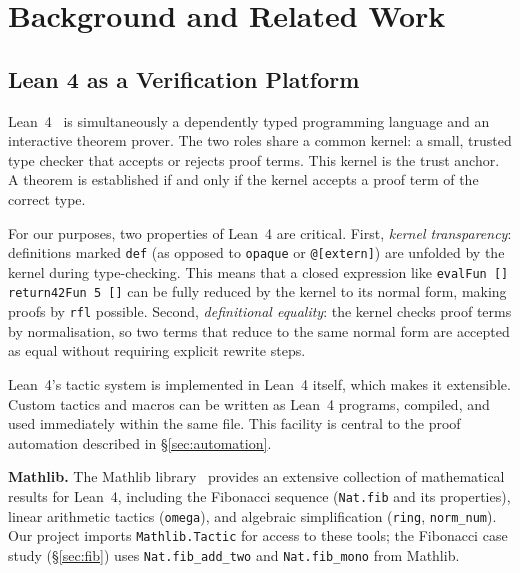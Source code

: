 
\section{Background and Related Work}
\label{sec:background}

\subsection{Lean 4 as a Verification Platform}

Lean~4~\cite{lean4} is simultaneously a dependently typed programming language
and an interactive theorem prover. The two roles share a common kernel: a small,
trusted type checker that accepts or rejects proof terms. This kernel is the
trust anchor. A theorem is established if and only if the kernel accepts a
proof term of the correct type.

For our purposes, two properties of Lean~4 are critical. First, \emph{kernel
transparency}: definitions marked \texttt{def} (as opposed to \texttt{opaque}
or \texttt{@[extern]}) are unfolded by the kernel during type-checking. This
means that a closed expression like \texttt{evalFun [] return42Fun 5 []}
can be fully reduced by the kernel to its normal form, making proofs by
\texttt{rfl} possible. Second, \emph{definitional equality}: the kernel
checks proof terms by normalisation, so two terms that reduce to the same
normal form are accepted as equal without requiring explicit rewrite steps.

Lean~4's tactic system is implemented in Lean~4 itself, which makes it
extensible. Custom tactics and macros can be written as Lean~4 programs,
compiled, and used immediately within the same file. This facility is
central to the proof automation described in \S\ref{sec:automation}.

\textbf{Mathlib.} The Mathlib library~\cite{mathlib2020} provides an extensive
collection of mathematical results for Lean~4, including the Fibonacci
sequence (\texttt{Nat.fib} and its properties), linear arithmetic tactics
(\texttt{omega}), and algebraic simplification (\texttt{ring}, \texttt{norm\_num}).
Our project imports \texttt{Mathlib.Tactic} for access to these tools;
the Fibonacci case study (\S\ref{sec:fib}) uses
\texttt{Nat.fib\_add\_two} and \texttt{Nat.fib\_mono} from Mathlib.

